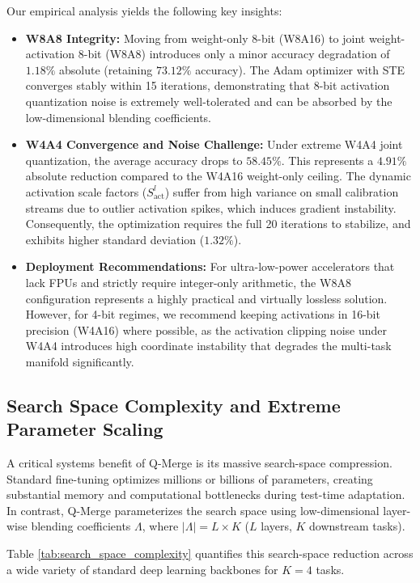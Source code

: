 Our empirical analysis yields the following key insights:
\begin{itemize}
    \item \textbf{W8A8 Integrity:} Moving from weight-only 8-bit (W8A16) to joint weight-activation 8-bit (W8A8) introduces only a minor accuracy degradation of $1.18\%$ absolute (retaining $73.12\%$ accuracy). The Adam optimizer with STE converges stably within 15 iterations, demonstrating that 8-bit activation quantization noise is extremely well-tolerated and can be absorbed by the low-dimensional blending coefficients.
    \item \textbf{W4A4 Convergence and Noise Challenge:} Under extreme W4A4 joint quantization, the average accuracy drops to $58.45\%$. This represents a $4.91\%$ absolute reduction compared to the W4A16 weight-only ceiling. The dynamic activation scale factors ($S^l_{\text{act}}$) suffer from high variance on small calibration streams due to outlier activation spikes, which induces gradient instability. Consequently, the optimization requires the full 20 iterations to stabilize, and exhibits higher standard deviation ($1.32\%$).
    \item \textbf{Deployment Recommendations:} For ultra-low-power accelerators that lack FPUs and strictly require integer-only arithmetic, the W8A8 configuration represents a highly practical and virtually lossless solution. However, for 4-bit regimes, we recommend keeping activations in 16-bit precision (W4A16) where possible, as the activation clipping noise under W4A4 introduces high coordinate instability that degrades the multi-task manifold significantly.
\end{itemize}

\subsection{Search Space Complexity and Extreme Parameter Scaling}
\label{subsec:complexity_scaling}

A critical systems benefit of Q-Merge is its massive search-space compression. Standard fine-tuning optimizes millions or billions of parameters, creating substantial memory and computational bottlenecks during test-time adaptation. In contrast, Q-Merge parameterizes the search space using low-dimensional layer-wise blending coefficients $\Lambda$, where $|\Lambda| = L \times K$ ($L$ layers, $K$ downstream tasks).

Table \ref{tab:search_space_complexity} quantifies this search-space reduction across a wide variety of standard deep learning backbones for $K=4$ tasks. 

